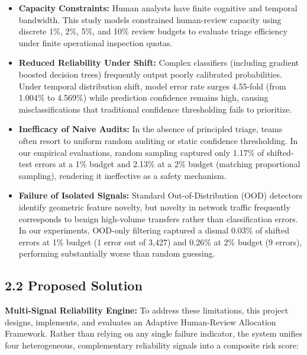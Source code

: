 \begin{itemize}
\item \textbf{Capacity Constraints:} Human analysts have finite cognitive and temporal bandwidth. This study models constrained human-review capacity using discrete 1\%, 2\%, 5\%, and 10\% review budgets to evaluate triage efficiency under finite operational inspection quotas.
\item \textbf{Reduced Reliability Under Shift:} Complex classifiers (including gradient boosted decision trees) frequently output poorly calibrated probabilities. Under temporal distribution shift, model error rate surges 4.55-fold (from 1.004\% to 4.569\%) while prediction confidence remains high, causing misclassifications that traditional confidence thresholding fails to prioritize.
\item \textbf{Inefficacy of Naive Audits:} In the absence of principled triage, teams often resort to uniform random auditing or static confidence thresholding. In our empirical evaluations, random sampling captured only 1.17\% of shifted-test errors at a 1\% budget and 2.13\% at a 2\% budget (matching proportional sampling), rendering it ineffective as a safety mechanism.
\item \textbf{Failure of Isolated Signals:} Standard Out-of-Distribution (OOD) detectors identify geometric feature novelty, but novelty in network traffic frequently corresponds to benign high-volume transfers rather than classification errors. In our experiments, OOD-only filtering captured a dismal 0.03\% of shifted errors at 1\% budget (1 error out of 3,427) and 0.26\% at 2\% budget (9 errors), performing substantially worse than random guessing.
\end{itemize}

\subsection{2.2 Proposed Solution}

\textbf{Multi-Signal Reliability Engine:} To address these limitations, this project designs, implements, and evaluates an Adaptive Human-Review Allocation Framework. Rather than relying on any single failure indicator, the system unifies four heterogeneous, complementary reliability signals into a composite risk score:

